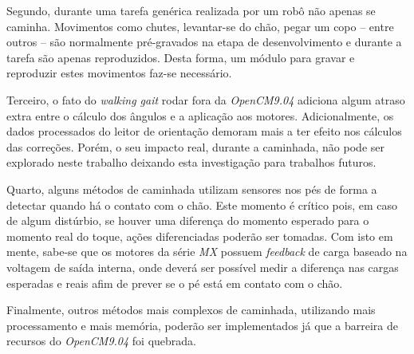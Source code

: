 Segundo, durante uma tarefa genérica realizada por um robô não apenas se caminha. Movimentos como chutes, levantar-se do chão, pegar um copo -- entre outros -- são normalmente pré-gravados na etapa de desenvolvimento e durante a tarefa são apenas reproduzidos. Desta forma, um módulo para gravar e reproduzir estes movimentos faz-se necessário.

Terceiro, o fato do \textit{walking gait} rodar fora da \textit{OpenCM9.04} adiciona algum atraso extra entre o cálculo dos ângulos e a aplicação aos motores. Adicionalmente, os dados processados do leitor de orientação demoram mais a ter efeito nos cálculos das correções. Porém, o seu impacto real, durante a caminhada, não pode ser explorado neste trabalho deixando esta investigação para trabalhos futuros.

Quarto, alguns métodos de caminhada utilizam sensores nos pés de forma a detectar quando há o contato com o chão. Este momento é crítico pois, em caso de algum distúrbio, se houver uma diferença do momento esperado para o momento real do toque, ações diferenciadas poderão ser tomadas. Com isto em mente, sabe-se que os motores da série \textit{MX} possuem \textit{feedback} de carga baseado na voltagem de saída interna, onde deverá ser possível medir a diferença nas cargas esperadas e reais afim de prever se o pé está em contato com o chão.

Finalmente, outros métodos mais complexos de caminhada, utilizando mais processamento e mais memória, poderão ser implementados já que a barreira de recursos do \textit{OpenCM9.04} foi quebrada.